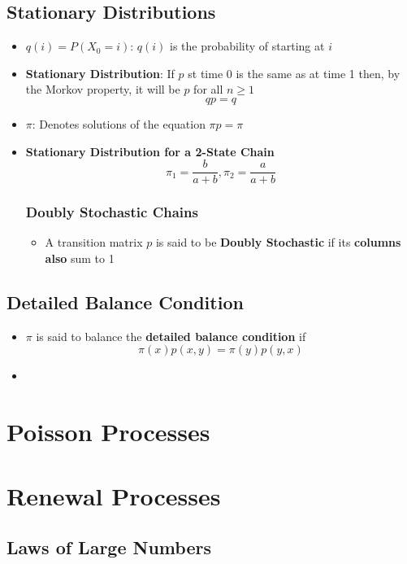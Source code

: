 \documentclass{report}
\begin{document}
\section{Stationary Distributions}%
  \begin{itemize}
    \item $q(i) = P(X_0 = i)$: $q(i)$ is the probability of starting at $i$
    \item  \textbf{Stationary Distribution}: If $p$ st time 0 is the same as
      at time 1 then, by the Morkov property, it will be $p$ for all $n \geq 1$
      \[ qp = q \]
    \item $\pi$: Denotes solutions of the equation $\pi p = \pi$
    \item \textbf{Stationary Distribution for a 2-State Chain}
      \[ \pi_1 = \frac{b}{a+b} , \pi_2 = \frac{a}{a+b} \]
    \subsection{Doubly Stochastic Chains}%
    \label{sub:Doubly Stochastic Chains}
    \begin{itemize}
      \item A transition matrix $p$ is said to be \textbf{Doubly Stochastic}
        if its \textbf{columns also} sum to 1
    \end{itemize}

  \end{itemize}

\section{Detailed Balance Condition}%
\label{sec:Detailed Balance Condition}
  \begin{itemize}
    \item $\pi$ is said to balance the \textbf{detailed balance condition} if
      \[
        \pi(x)p(x,y) = \pi(y)p(y,x)
      \]
    \item 
  \end{itemize}


\chapter{Poisson Processes}

\chapter{Renewal Processes}
\section{Laws of Large Numbers}
\end{document}
